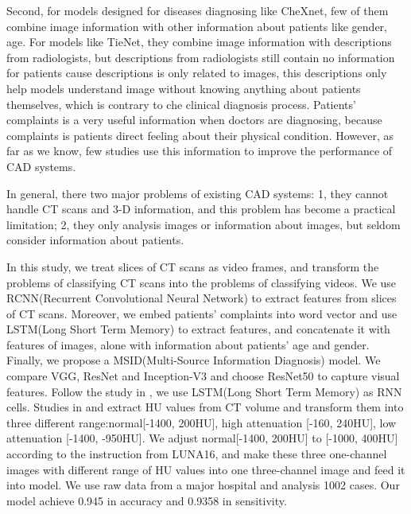 \documentclass[runningheads]{llncs}
\begin{document}
Second, for models designed for diseases diagnosing like CheXnet, few of them combine image information with other information about patients like gender, age. For models like TieNet, they combine image information with descriptions from radiologists, but descriptions from radiologists still contain no information for patients cause descriptions is only related to images, this descriptions only help models understand image without knowing anything about patients themselves, which is contrary to che clinical diagnosis process. Patients' complaints is a very useful information when doctors are diagnosing, because complaints is patients direct feeling about their physical condition. However, as far as we know, few studies use this information to improve the performance of CAD systems.

In general, there two major problems of existing CAD systems: 1, they cannot handle CT scans and 3-D information, and this problem has become a practical limitation; 2, they only analysis images or information about images, but seldom consider information about patients.

In this study, we treat slices of CT scans as video frames, and transform the problems of classifying CT scans into the problems of classifying videos. We use RCNN(Recurrent Convolutional Neural Network) to extract features from slices of CT scans. Moreover, we embed patients' complaints into word vector
\cite{mikolov2013efficient}\cite{mikolov2013distributed} and use LSTM(Long Short Term Memory) to extract features, and concatenate it with features of images, alone with information about patients' age and gender. Finally, we propose a MSID(Multi-Source Information Diagnosis) model.
We compare VGG\cite{simonyan2015very}, ResNet\cite{he2016deep} and Inception-V3 \cite{szegedy2016rethinking} and choose ResNet50 to capture visual features. Follow the study in \cite{Donahue2015Long}, we use LSTM(Long Short Term Memory)\cite{hochreiter1997long} as RNN cells. 
Studies in \cite{gao2018holistic} and \cite{Shin2017Three} extract HU values from CT volume and transform them into three different range:normal[-1400, 200HU], high attenuation [-160, 240HU], low attenuation [-1400, -950HU]. We adjust normal[-1400, 200HU] to [-1000, 400HU] according to the instruction from LUNA16\cite{Aaa2016Validation}, and make these three one-channel images with different range of HU values into one three-channel image and feed it into model. We use raw data from a major hospital and analysis 1002 cases. Our model achieve 0.945 in accuracy and 0.9358 in sensitivity.
\end{document}
